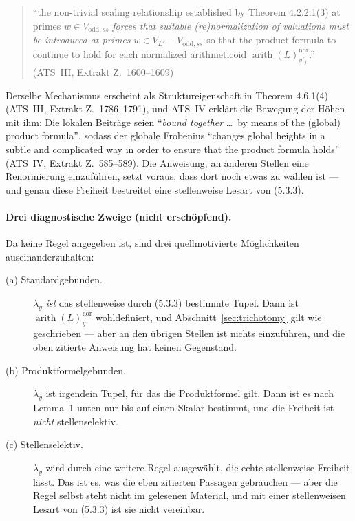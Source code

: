 \documentclass[11pt,a4paper]{article}
\theoremstyle{definition}
\theoremstyle{plain}
\theoremstyle{definition}
\newcommand{\arith}{\operatorname{arith}}
\newcommand{\anchor}[2]{(#1, Extrakt Z.~#2)}
\begin{document}
\begin{quote}\small
``the non-trivial scaling relationship established by Theorem 4.2.2.1(3) at primes
$w \in V_{\mathrm{odd},ss}$ \emph{forces that suitable (re)normalization of
valuations must be introduced at primes} $w \in V_{L'} - V_{\mathrm{odd},ss}$ so
that the product formula to continue to hold for each normalized arithmeticoid
$\arith(L)^{\mathrm{nor}}_{y'_j}$.'' \hfill\anchor{ATS~III}{1600--1609}
\end{quote}

Derselbe Mechanismus erscheint als Struktureigenschaft in Theorem 4.6.1(4)
\anchor{ATS~III}{1786--1791}, und ATS~IV erklärt die Bewegung der Höhen mit ihm:
Die lokalen Beiträge seien ``\emph{bound together} \ldots\ by means of the
(global) product formula'', sodass der globale Frobenius ``changes global heights
in a subtle and complicated way in order to ensure that the product formula
holds'' \anchor{ATS~IV}{585--589}. Die Anweisung, an anderen Stellen eine
Renormierung einzuführen, setzt voraus, dass dort noch etwas zu wählen ist --- und
genau diese Freiheit bestreitet eine stellenweise Lesart von (5.3.3).

\paragraph{Drei diagnostische Zweige (nicht erschöpfend).}
Da keine Regel angegeben ist, sind drei quellmotivierte Möglichkeiten auseinanderzuhalten:

\begin{description}
\item[(a) Standardgebunden.] $\lambda_y$ \emph{ist} das stellenweise durch (5.3.3)
  bestimmte Tupel. Dann ist $\arith(L)^{\mathrm{nor}}_y$ wohldefiniert, und
  Abschnitt~\ref{sec:trichotomy} gilt wie geschrieben --- aber an den übrigen
  Stellen ist nichts \glqq einzuführen\grqq{}, und die oben zitierte Anweisung hat
  keinen Gegenstand.
\item[(b) Produktformelgebunden.] $\lambda_y$ ist irgendein Tupel, für das die
  Produktformel gilt. Dann ist es nach Lemma~1 unten nur bis auf einen Skalar
  bestimmt, und die Freiheit ist \emph{nicht} stellenselektiv.
\item[(c) Stellenselektiv.] $\lambda_y$ wird durch eine weitere Regel ausgewählt,
  die echte stellenweise Freiheit lässt. Das ist es, was die eben zitierten
  Passagen gebrauchen --- aber die Regel selbst steht nicht im gelesenen Material,
  und mit einer stellenweisen Lesart von (5.3.3) ist sie nicht vereinbar.
\end{description}
\end{document}
